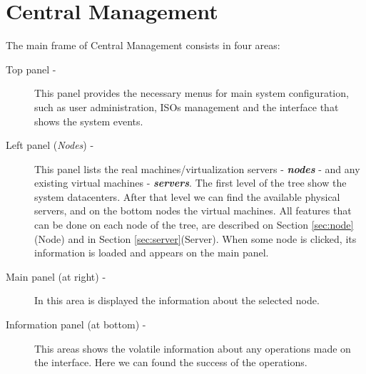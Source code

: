 
\chapter{\textsf{Central Management}}

The main frame of Central Management consists in four areas:

\begin{description}
	\item[Top panel -] This panel provides the necessary menus for main system configuration, such as user administration, ISOs management and the interface that shows the system events.
	\item[Left panel (\emph{Nodes}) -] This panel lists the real machines/virtualization servers - {\bf\emph{nodes}} - and any existing virtual machines - {\bf\emph{servers}}. The first level of the tree show the system datacenters. After that level we can find the available physical servers, and on the bottom nodes the virtual machines. All features that can be done on each node of the tree, are described on Section \ref{sec:node}(Node) and in Section \ref{sec:server}(Server). When some node is clicked, its information is loaded and appears on the main panel.
	\item[Main panel (at right) -] In this area is displayed the information about the selected node.
	\item[Information panel (at bottom) -] This areas shows the volatile information about any operations made on the interface. Here we can found the success of the operations.
\end{description}

